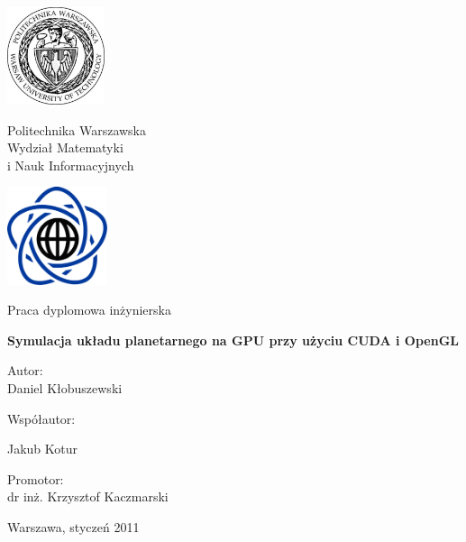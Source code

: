 \thispagestyle{empty}
\begin{center}
\Large

\begin{minipage}{0.2\linewidth}
\centering
\includegraphics[height=2.86cm]{img/logo_pw.pdf}
\end{minipage}
\begin{minipage}{0.55\linewidth}
\centering
Politechnika Warszawska \\[0.5em] Wydział Matematyki \\ i Nauk Informacyjnych
\end{minipage}
\begin{minipage}{0.2\linewidth}
\centering
\includegraphics[height=2.86cm]{img/logo_mini.pdf}
\end{minipage}

\vspace{2em}
Praca dyplomowa inżynierska
\vspace{5em}

\huge
\textbf{Symulacja układu planetarnego na GPU przy użyciu CUDA i OpenGL}

\large

\vspace{4em}

\hfill
\begin{minipage}{0.4\linewidth}
Autor:
\vspace{0.5em}
\\
Daniel Kłobuszewski

\vspace{1em}

Współautor:

\vspace{0.5em}
Jakub Kotur

\vspace{1em}

Promotor:
\vspace{0.5em}
\\
dr inż. Krzysztof Kaczmarski
\end{minipage}

\vfill
Warszawa, styczeń 2011
\end{center}

